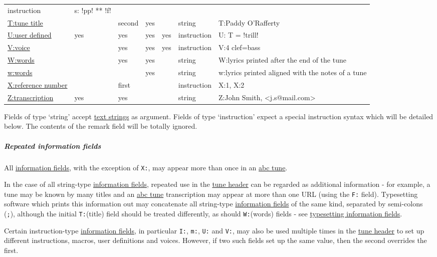 \begin{longtable}[]{@{}lllllll@{}}
instruction & s: !pp! ** !f!\tabularnewline
\protect\hyperlink{ttune_title}{T:tune title} & & second & yes & &
string & T:Paddy O'Rafferty\tabularnewline
\protect\hyperlink{redefinable_symbols}{U:user defined} & yes & yes &
yes & yes & instruction & U: T = !trill!\tabularnewline
\protect\hyperlink{multiple_voices}{V:voice} & & yes & yes & yes &
instruction & V:4 clef=bass\tabularnewline
\protect\hyperlink{lyrics}{W:words} & & yes & yes & & string & W:lyrics
printed after the end of the tune\tabularnewline
\protect\hyperlink{lyrics}{w:words} & & & yes & & string & w:lyrics
printed aligned with the notes of a tune\tabularnewline
\protect\hyperlink{xreference_number}{X:reference number} & & first & &
& instruction & X:1, X:2\tabularnewline
\protect\hyperlink{ztranscription}{Z:transcription} & yes & yes & & &
string & Z:John Smith,
\textless{}j.s@mail.com\textgreater{}\tabularnewline
\bottomrule
\end{longtable}

Fields of type `string' accept
\protect\hyperlink{text_string_definition}{text strings} as argument.
Fields of type `instruction' expect a special instruction syntax which
will be detailed below. The contents of the remark field will be totally
ignored.

\subparagraph{Repeated information
fields}\label{repeated_information_fields}

All \protect\hyperlink{information_field_definition}{information
fields}, with the exception of \texttt{X:}, may appear more than once in
an \protect\hyperlink{abc_tune_definition}{abc tune}.

In the case of all string-type
\protect\hyperlink{information_field_definition}{information fields},
repeated use in the \protect\hyperlink{tune_header_definition}{tune
header} can be regarded as additional information - for example, a tune
may be known by many titles and an
\protect\hyperlink{abc_tune_definition}{abc tune} transcription may
appear at more than one URL (using the \texttt{F:} field). Typesetting
software which prints this information out may concatenate all
string-type \protect\hyperlink{information_field_definition}{information
fields} of the same kind, separated by semi-colons (\texttt{;}),
although the initial \texttt{T:}(title) field should be treated
differently, as should \texttt{W:}(words) fields - see
\protect\hyperlink{typesetting_information_fields}{typesetting
information fields}.

Certain instruction-type
\protect\hyperlink{information_field_definition}{information fields}, in
particular \texttt{I:}, \texttt{m:}, \texttt{U:} and \texttt{V:}, may
also be used multiple times in the
\protect\hyperlink{tune_header_definition}{tune header} to set up
different instructions, macros, user definitions and voices. However, if
two such fields set up the same value, then the second overrides the
first.

